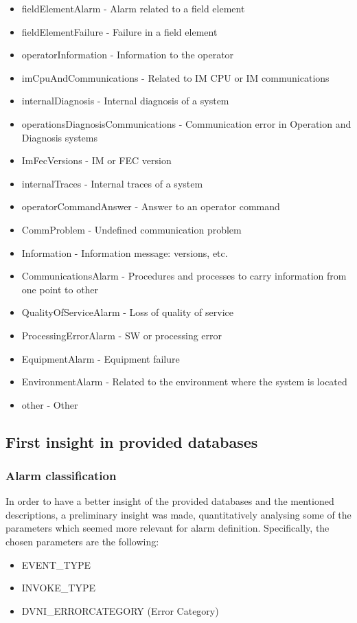 \documentclass[a4paper,10pt]{article}
\begin{document}
\begin{itemize}
  \item fieldElementAlarm - Alarm related to a field element
  \item fieldElementFailure - Failure in a field element
  \item operatorInformation - Information to the operator
  \item imCpuAndCommunications - Related to IM CPU or IM communications
  \item internalDiagnosis - Internal diagnosis of a system
  \item operationsDiagnosisCommunications - Communication error in Operation and Diagnosis systems
  \item ImFecVersions - IM or FEC version
  \item internalTraces - Internal traces of a system
  \item operatorCommandAnswer - Answer to an operator command
  \item CommProblem - Undefined communication problem
  \item Information - Information message: versions, etc.
  \item CommunicationsAlarm - Procedures and processes to carry information from one point to other
  \item QualityOfServiceAlarm - Loss of quality of service
  \item ProcessingErrorAlarm - SW or processing error
  \item EquipmentAlarm - Equipment failure
  \item EnvironmentAlarm - Related to the environment where the system is located
  \item other - Other
\end{itemize}

\subsection{First insight in provided databases}
\subsubsection{Alarm classification}
In order to have a better insight of the provided databases and the mentioned descriptions, a preliminary insight was made, quantitatively analysing some of the parameters which seemed more relevant for alarm definition. Specifically, the chosen parameters are the following:

\begin{itemize}
 \item EVENT\_TYPE
 \item INVOKE\_TYPE
 \item DVNI\_ERRORCATEGORY (Error Category)
\end{itemize}
\end{document}
